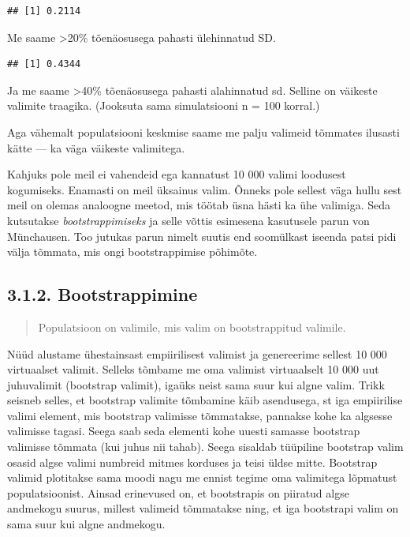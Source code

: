 \documentclass[]{book}
\newenvironment{Shaded}{\begin{snugshade}}{\end{snugshade}}
\newcommand{\KeywordTok}[1]{\textcolor[rgb]{0.13,0.29,0.53}{\textbf{#1}}}
\newcommand{\DecValTok}[1]{\textcolor[rgb]{0.00,0.00,0.81}{#1}}
\newcommand{\OperatorTok}[1]{\textcolor[rgb]{0.81,0.36,0.00}{\textbf{#1}}}
\newcommand{\NormalTok}[1]{#1}
\begin{document}
\begin{verbatim}
## [1] 0.2114
\end{verbatim}

Me saame \textgreater{}20\% tõenäosusega pahasti ülehinnatud SD.

\begin{Shaded}
\end{Shaded}

\begin{verbatim}
## [1] 0.4344
\end{verbatim}

Ja me saame \textgreater{}40\% tõenäosusega pahasti alahinnatud sd.
Selline on väikeste valimite traagika. (Jooksuta sama simulatsiooni n =
100 korral.)

Aga vähemalt populatsiooni keskmise saame me palju valimeid tõmmates
ilusasti kätte --- ka väga väikeste valimitega.

Kahjuks pole meil ei vahendeid ega kannatust 10 000 valimi loodusest
kogumiseks. Enamasti on meil üksainus valim. Õnneks pole sellest väga
hullu sest meil on olemas analoogne meetod, mis töötab üsna hästi ka ühe
valimiga. Seda kutsutakse \emph{bootstrappimiseks} ja selle võttis
esimesena kasutusele parun von Münchausen. Too jutukas parun nimelt
suutis end soomülkast iseenda patsi pidi välja tõmmata, mis ongi
bootstrappimise põhimõte.

\subsection{3.1.2. Bootstrappimine}\label{bootstrappimine}

\begin{quote}
Populatsioon on valimile, mis valim on bootstrappitud valimile.
\end{quote}

Nüüd alustame ühestainsast empiirilisest valimist ja genereerime sellest
10 000 virtuaalset valimit. Selleks tõmbame me oma valimist virtuaalselt
10 000 uut juhuvalimit (bootstrap valimit), igaüks neist sama suur kui
algne valim. Trikk seisneb selles, et bootstrap valimite tõmbamine käib
asendusega, st iga empiirilise valimi element, mis bootstrap valimisse
tõmmatakse, pannakse kohe ka algsesse valimisse tagasi. Seega saab seda
elementi kohe uuesti samasse bootstrap valimisse tõmmata (kui juhus nii
tahab). Seega sisaldab tüüpiline bootstrap valim osasid algse valimi
numbreid mitmes korduses ja teisi üldse mitte. Bootstrap valimid
plotitakse sama moodi nagu me ennist tegime oma valimitega lõpmatust
populatsioonist. Ainsad erinevused on, et bootstrapis on piiratud algse
andmekogu suurus, millest valimeid tõmmatakse ning, et iga bootstrapi
valim on sama suur kui algne andmekogu.
\end{document}
